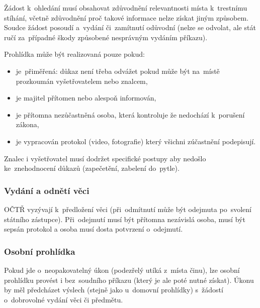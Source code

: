 Žádost k~ohledání musí obsahovat zdůvodnění relevantnosti místa k~trestnímu stíhání, včetně zdůvodnění proč takové informace nelze získat jiným způsobem.
Soudce žádost posoudí a~vydání či~zamítnutí odůvodní (nelze se odvolat, ale stát ručí za~případné škody způsobené nesprávným vydáním příkazu).

Prohlídka může být realizovaná pouze pokud:
\vspace*{-1em}\begin{itemize}
\item je~přiměřená: důkaz není třeba odvážet pokud může být na~místě prozkoumán vyšetřovatelem nebo znalcem,
\item je majitel přítomen nebo alespoň informován,
\item je přítomna nezůčastněná osoba, která kontroluje že nedochází k~porušení zákona,
\item je vypracován protokol (video, fotografie) který všichni zúčastnění podepisují.
\end{itemize}

Znalec i vyšetřovatel musí dodržet specifické postupy aby nedošlo ke~znehodnocení důkazů (zapečetění, zabelení do~pytle).

\subsubsection{Vydání a odnětí věci}

OČTŘ vyzývají k~předložení věci (při~odmítnutí může být odejmuta po~svolení státního zástupce).
Při~odejmutí musí být přítomna nezávislá osoba, musí být sepsán protokol a osoba musí dosta potvrzení o~odejmutí.


\subsubsection{Osobní prohlídka}

Pokud jde o~neopakovatelný úkon (podezřelý utíká z~místa činu), lze osobní prohlídku provést i bez~soudního příkazu (který je ale poté nutné získat).
Úkonu by měl předcházet výslech (stejně jako u~domovní prohlídky) s~žádostí o~dobrovolné vydání věci či předmětu.


